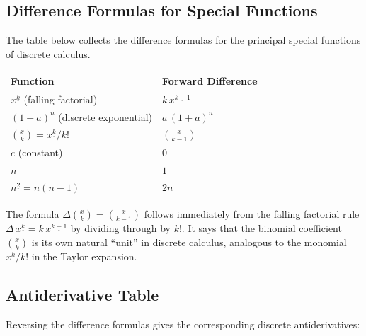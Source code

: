 
\subsection*{Difference Formulas for Special Functions}

\begin{exposition}
The table below collects the difference formulas for the principal
special functions of discrete calculus.
\end{exposition}

\begin{remark*}[Interpretation]
\renewcommand{\arraystretch}{1.7}
\begin{tabular}{@{}l l@{}}
\textbf{Function} & \textbf{Forward Difference} \\
\hline
$x^{\underline{k}}$ (falling factorial) & $k\,x^{\underline{k-1}}$ \\
$(1+a)^n$ (discrete exponential) & $a\,(1+a)^n$ \\
$\binom{x}{k} = x^{\underline{k}}/k!$ & $\binom{x}{k-1}$ \\
$c$ (constant) & $0$ \\
$n$ & $1$ \\
$n^{\underline{2}} = n(n-1)$ & $2n$ \\
\end{tabular}
\end{remark*}

\begin{remark*}[Interpretation]
The formula \(\Delta\binom{x}{k} = \binom{x}{k-1}\) follows immediately
from the falling factorial rule \(\Delta\,x^{\underline{k}} = k\,x^{\underline{k-1}}\)
by dividing through by \(k!\). It says that the binomial coefficient
\(\binom{x}{k}\) is its own natural ``unit'' in discrete calculus, analogous
to the monomial \(x^k/k!\) in the Taylor expansion.
\end{remark*}

\subsection*{Antiderivative Table}

\begin{exposition}
Reversing the difference formulas gives the corresponding
discrete antiderivatives:
\end{exposition}

